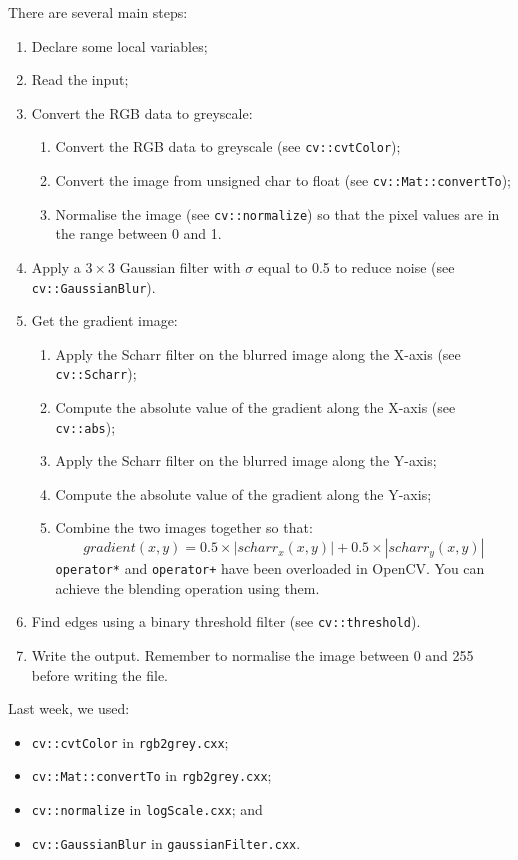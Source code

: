 \documentclass[english,a4paper,12pt,oneside]{article}
\begin{document}
There are several main steps:
\begin{enumerate}
	\item Declare some local variables;

	\item Read the input;

	\item Convert the RGB data to greyscale:

	\begin{enumerate}
		\item Convert the RGB data to greyscale (see \verb+cv::cvtColor+);
		\item Convert the image from unsigned char to float (see \verb+cv::Mat::convertTo+);
		\item Normalise the image (see \verb+cv::normalize+) so that the pixel values are in the range between 0 and 1.
	\end{enumerate}

	\item Apply a $3 \times 3$ Gaussian filter with $\sigma$ equal to 0.5 to reduce noise (see \verb+cv::GaussianBlur+).

	\item Get the gradient image:
	\begin{enumerate}
		\item Apply the Scharr filter on the blurred image along the X-axis (see \verb+cv::Scharr+);
		\item Compute the absolute value of the gradient along the X-axis (see \verb+cv::abs+);
		\item Apply the Scharr filter on the blurred image along the Y-axis;
		\item Compute the absolute value of the gradient along the Y-axis;
		\item Combine the two images together so that:
		$$gradient(x,y) = 0.5 \times |scharr_x(x,y)| + 0.5 \times |scharr_y(x,y)|$$
		\verb+operator*+ and \verb!operator+! have been overloaded in OpenCV. You can achieve the blending operation using them.
	\end{enumerate}
	\item Find edges using a binary threshold filter (see \verb+cv::threshold+).
	\item Write the output. Remember to normalise the image between 0 and 255 before writing the file. 
\end{enumerate}

Last week, we used:
\begin{itemize}
 \item \verb+cv::cvtColor+ in \verb+rgb2grey.cxx+; 
 \item \verb+cv::Mat::convertTo+ in \verb+rgb2grey.cxx+; 
 \item \verb+cv::normalize+ in \verb+logScale.cxx+; and 
 \item \verb+cv::GaussianBlur+ in \verb+gaussianFilter.cxx+.
\end{itemize}
\end{document}
